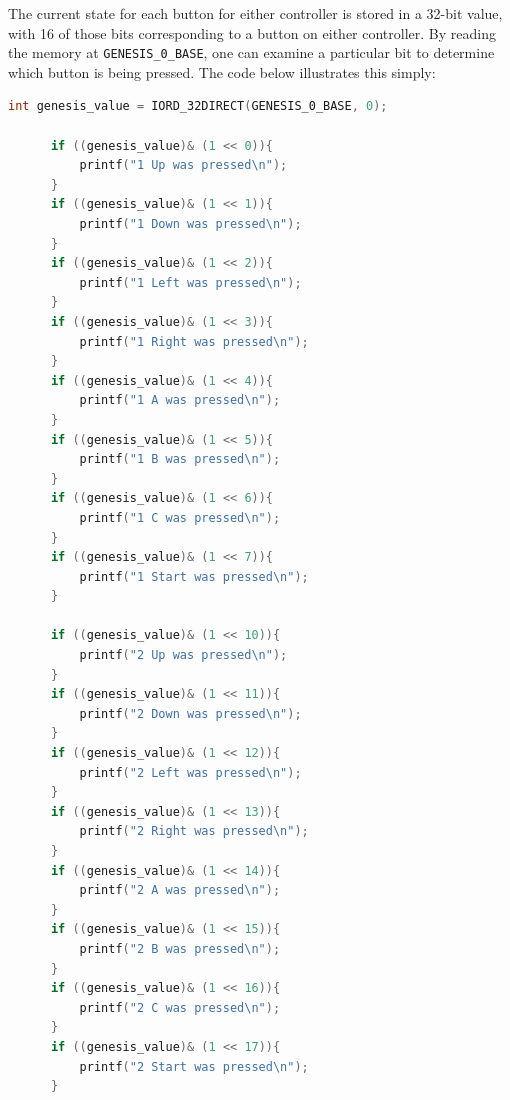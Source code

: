 \documentclass{capstonedoc}
\begin{document}
The current state for each button for either controller is stored 
in a 32-bit value, with 16 of those bits corresponding to a button 
on either controller. By reading the memory at \texttt{GENESIS\_0\_BASE}, 
one can examine a particular bit to determine which button is being 
pressed. The code below illustrates this simply: 

\begin{lstlisting}[language={c},tabsize=2,caption={Reading Genesis Controller State}]
	  int genesis_value = IORD_32DIRECT(GENESIS_0_BASE, 0);

	  if ((genesis_value)& (1 << 0)){
		  printf("1 Up was pressed\n");
	  }
	  if ((genesis_value)& (1 << 1)){
		  printf("1 Down was pressed\n");
	  }
	  if ((genesis_value)& (1 << 2)){
		  printf("1 Left was pressed\n");
	  }
	  if ((genesis_value)& (1 << 3)){
		  printf("1 Right was pressed\n");
	  }
	  if ((genesis_value)& (1 << 4)){
		  printf("1 A was pressed\n");
	  }
	  if ((genesis_value)& (1 << 5)){
		  printf("1 B was pressed\n");
	  }
	  if ((genesis_value)& (1 << 6)){
		  printf("1 C was pressed\n");
	  }
	  if ((genesis_value)& (1 << 7)){
		  printf("1 Start was pressed\n");
	  }

	  if ((genesis_value)& (1 << 10)){
		  printf("2 Up was pressed\n");
	  }
	  if ((genesis_value)& (1 << 11)){
		  printf("2 Down was pressed\n");
	  }
	  if ((genesis_value)& (1 << 12)){
		  printf("2 Left was pressed\n");
	  }
	  if ((genesis_value)& (1 << 13)){
		  printf("2 Right was pressed\n");
	  }
	  if ((genesis_value)& (1 << 14)){
		  printf("2 A was pressed\n");
	  }
	  if ((genesis_value)& (1 << 15)){
		  printf("2 B was pressed\n");
	  }
	  if ((genesis_value)& (1 << 16)){
		  printf("2 C was pressed\n");
	  }
	  if ((genesis_value)& (1 << 17)){
		  printf("2 Start was pressed\n");
	  }
\end{lstlisting}

\newpage



\end{document}
